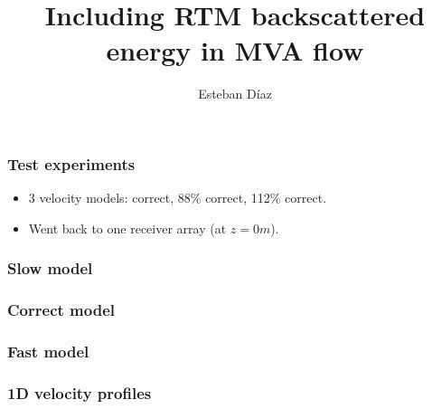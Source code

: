 

\title[]{Including RTM backscattered energy in MVA flow}
\subtitle{}
\author[]{Esteban  D\'{i}az}
\date{}
\logo{}

\def\big#1{\begin{center} \LARGE \textbf{#1} \end{center}}
\def\cen#1{\begin{center}        \textbf{#1} \end{center}}

 { \cwpcover }

\begin{frame} \frametitle{Test experiments}
\begin{itemize}
   \item 3 velocity models: correct, 88\% correct, 112\% correct.
   \item Went back to one receiver array (at $z=0m$).
\end{itemize}
\end{frame}
\cwpnote{}

\begin{frame} \frametitle{Slow model}  \end{frame}
\begin{frame} \frametitle{Correct model}  \end{frame}
\begin{frame} \frametitle{Fast model}  \end{frame}
\begin{frame} \frametitle{1D velocity profiles}  \end{frame}


\begin{frame} 
 \begin{columns} 
 \end{columns} 
\end{frame} 

